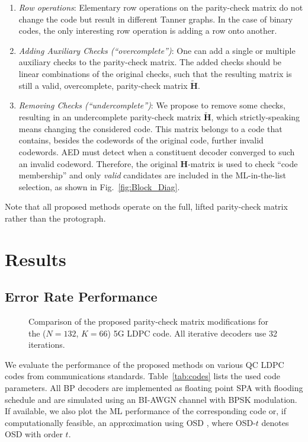 \documentclass[conference]{IEEEtran}
\newcommand\new[1]{#1}
\begin{document}
\begin{NoHyper}
\begin{enumerate}
    \item \textit{Row operations}: 
    Elementary row operations on the parity-check matrix do not change the code but result in different Tanner graphs. In the case of binary codes, the only interesting row operation is adding a row onto another.
    \item \textit{Adding Auxiliary Checks (``overcomplete'')}: 
    One can add a single or multiple auxiliary checks to the parity-check matrix. The added checks should be linear combinations of the original checks, such that the resulting matrix is still a valid, overcomplete, parity-check matrix $\mathbf{\tilde{H}}$.
    \item \textit{Removing Checks (``undercomplete'')}: 
     We propose to remove some checks, resulting in an undercomplete parity-check matrix $\mathbf{\tilde{H}}$, which strictly-speaking means changing the considered code. This matrix belongs to a code that contains, besides the codewords of the original code, further invalid codewords. \ac{AED} must detect when a constituent decoder converged to such an invalid codeword. Therefore, the original $\mathbf{H}$-matrix is used to check ``code membership'' and only \emph{valid} candidates are included in the ML-in-the-list selection, as shown in Fig.~\ref{fig:Block_Diag}.
\end{enumerate}

Note that all proposed methods operate on the full, lifted parity-check matrix rather than the protograph. 

\section{Results}
\subsection{Error Rate Performance}
\begin{figure} [t]
	\centering
	\resizebox{\columnwidth}{!}{}
	\caption{\footnotesize Comparison of the proposed parity-check matrix modifications for the ($N=132$, $K=66$) 5G LDPC code. All iterative decoders use 32 iterations.}
	\label{fig:methods}
\end{figure}

We evaluate the performance of the proposed methods on various \ac{QC} \ac{LDPC} codes from communications standards. Table~\ref{tab:codes} lists the used code parameters. All \ac{BP} decoders are implemented as floating point \ac{SPA} with flooding schedule and are simulated using an \ac{BI-AWGN} channel with \ac{BPSK} modulation. If available, we also plot the \ac{ML} performance of the corresponding code \cite{kldatabase} or, if computationally feasible, an approximation using \ac{OSD} \new{\cite{OSD}}, where OSD-$t$ denotes \ac{OSD} with order $t$.


\end{NoHyper}
\end{document}
